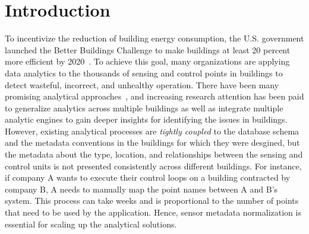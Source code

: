 \section{Introduction}

To incentivize the reduction of building energy consumption, the U.S. government
launched the Better Buildings Challenge to make buildings at least 20 percent
more efficient by 2020~\cite{doe2013better}. To achieve this goal, many organizations
are applying data analytics to the thousands of sensing and control points in
buildings to detect wasteful, incorrect, and unhealthy operation.
There have been many promising analytical approaches~\cite{}, and increasing research attention has been paid to generalize
analytics across multiple buildings as well as integrate multiple analytic engines to gain deeper insights
for identifying the issues in buildings.
However, existing analytical processes are \emph{tightly coupled} to the database schema and the metadata conventions in the buildings for which they were desgined, but the metadata about the type, location, and relationships between the sensing
and control units is not presented consistently across different buildings.
For instance, if company A wants to execute their
control loops on a building contracted by company B, A needs to manually
map the point names between A and B's system. This process can take weeks and is proportional
to the number of points that need to be used by the application.
Hence, sensor metadata normalization is essential for scaling up the analytical solutions.

